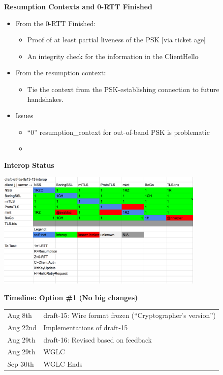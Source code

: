 \documentclass[helvetica]{seminar}
\newcommand{\heading}[1]{%
  \begin{center} 
    \large\bf 
    #1 
  \end{center} 
  \vspace{.4 in}}
\begin{document}
\begin{slide}
\heading{Resumption Contexts and 0-RTT Finished}

\begin{itemize}
\item From the 0-RTT Finished:
\begin{itemize}
\item Proof of at least partial liveness of the PSK [via ticket age]
\item An integrity check for the information in the ClientHello
\end{itemize}
\item From the resumption context:
\begin{itemize}
\item Tie the context from the PSK-establishing connection to
  future handshakes.
\end{itemize}

\item Issues
  \begin{itemize}
  \item ``0'' resumption\_context for out-of-band PSK is problematic
  \item 
  \end{itemize}
\end{itemize}

\end{slide}



\begin{slide}
\heading{Interop Status}

\includegraphics[width=4in]{interop-matrix}

\end{slide}


\begin{slide}
\heading{Timeline: Option \#1 (No big changes)}

\begin{tabular}{l l}
Aug 8th & draft-15: Wire format frozen (``Cryptographer's version'') \\
Aug 22nd & Implementations of draft-15 \\
Aug 29th & draft-16: Revised based on feedback \\
Aug 29th & WGLC \\
Sep 30th & WGLC Ends \\
\end{tabular}

\end{slide}
\end{document}
